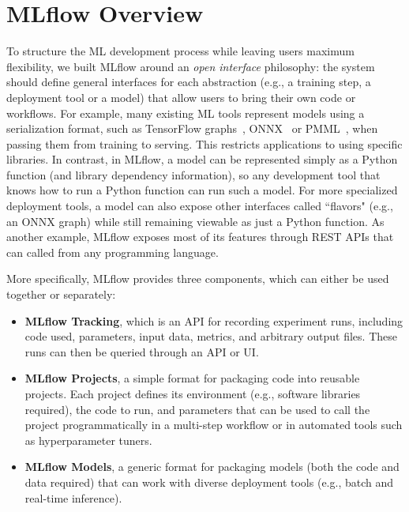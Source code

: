 \documentclass[11pt]{article}
\begin{document}
\section{MLflow Overview}

To structure the ML development process while leaving users maximum flexibility, we built MLflow around an \emph{open interface} philosophy: the system should define general interfaces for each abstraction (e.g., a training step, a deployment tool or a model) that allow users to bring their own code or workflows.
For example, many existing ML tools represent models using a serialization format, such as TensorFlow graphs~\cite{abadi2016tensorflow}, ONNX~\cite{onnx} or PMML~\cite{pmml}, when passing them from training to serving. This restricts applications to using specific libraries.
In contrast, in MLflow, a model can be represented simply as a Python function (and library dependency information), so any development tool that knows how to run a Python function can run such a model.
For more specialized deployment tools, a model can also expose other interfaces called ``flavors" (e.g., an ONNX graph) while still remaining viewable as just a Python function.
As another example, MLflow exposes most of its features through REST APIs that can called from any programming language.

More specifically, MLflow provides three components, which can either be used together or separately:

\begin{itemize}
\item \textbf{MLflow Tracking}, which is an API for recording experiment runs, including code used, parameters, input data, metrics, and arbitrary output files. These runs can then be queried through an API or UI.

\item\textbf{MLflow Projects}, a simple format for packaging code into reusable projects. Each project defines its environment (e.g., software libraries required), the code to run, and parameters that can be used to call the project programmatically in a multi-step workflow or in automated tools such as hyperparameter tuners.

\item\textbf{MLflow Models}, a generic format for packaging models (both the code and data required) that can work with diverse deployment tools (e.g., batch and real-time inference). %
\end{itemize}
\end{document}
